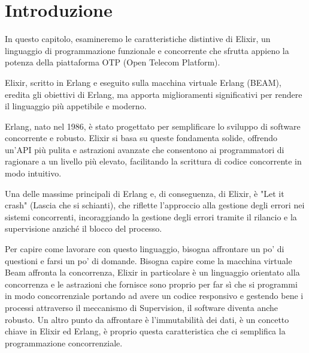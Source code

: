 \section{Introduzione}



In questo capitolo, esamineremo le caratteristiche distintive
di Elixir, un linguaggio di programmazione funzionale e
concorrente che sfrutta appieno la potenza della piattaforma
OTP (Open Telecom Platform).

Elixir, scritto in Erlang e eseguito sulla macchina virtuale
Erlang (BEAM), eredita gli obiettivi di Erlang, ma apporta
miglioramenti significativi per rendere il linguaggio più
appetibile e moderno.

Erlang, nato nel 1986, è stato progettato per semplificare
lo sviluppo di software concorrente e robusto.
Elixir si basa su queste fondamenta solide, offrendo un'API
più pulita e astrazioni avanzate che consentono ai programmatori
di ragionare a un livello più elevato, facilitando la scrittura
di codice concorrente in modo intuitivo.

Una delle massime principali di Erlang e, di conseguenza,
di Elixir, è "Let it crash" (Lascia che si schianti),
che riflette l'approccio alla gestione degli errori nei sistemi
concorrenti, incoraggiando la gestione degli errori tramite
il rilancio e la supervisione anziché il blocco del processo.

Per capire come lavorare con questo linguaggio, bisogna affrontare
un po' di questioni e farsi un po' di domande.
Bisogna capire come la macchina virtuale Beam affronta la concorrenza,
Elixir in particolare è un linguaggio orientato alla concorrenza e 
le astrazioni che fornisce sono proprio per far sì che
si programmi in modo concorrenziale portando ad avere un
codice responsivo e gestendo bene i processi attraverso 
il meccanismo di Supervision, il software diventa anche robusto.
Un altro punto da affrontare è l'immutabilità dei dati, è un concetto
chiave in Elixir ed Erlang, è proprio questa caratteristica
che ci semplifica la programmazione concorrenziale.
